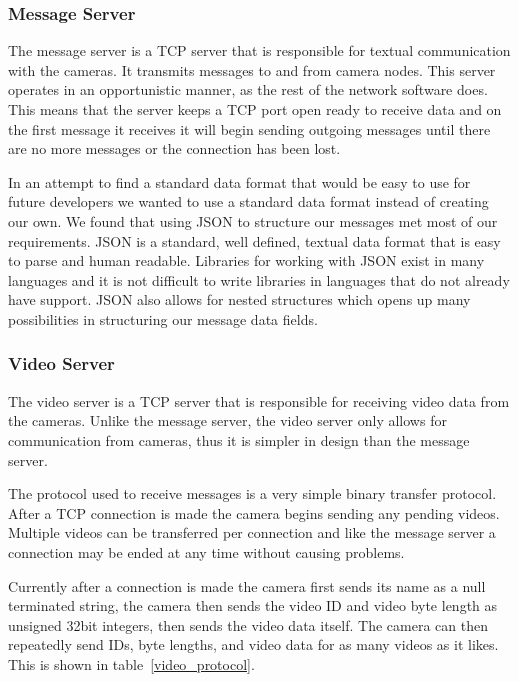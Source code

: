 \subsubsection{Message Server}

The message server is a TCP server that is responsible for textual communication
with the cameras. It transmits messages to and from camera nodes. This server
operates in an opportunistic manner, as the rest of the network software does.
This means that the server keeps a TCP port open ready to receive data and on
the first message it receives it will begin sending outgoing messages until
there are no more messages or the connection has been lost.

In an attempt to find a standard data format that would be easy to use for
future developers we wanted to use a standard data format instead of creating
our own. We found that using JSON to structure our messages met most of our
requirements. JSON is a standard, well defined, textual data format that is easy
to parse and human readable. Libraries for working with JSON exist in many
languages and it is not difficult to write libraries in languages that do not
already have support. JSON also allows for nested structures which opens up many
possibilities in structuring our message data fields.


\subsubsection{Video Server}

The video server is a TCP server that is responsible for receiving video data
from the cameras. Unlike the message server, the video server only allows for
communication from cameras, thus it is simpler in design than the message
server.

The protocol used to receive messages is a very simple binary transfer protocol.
After a TCP connection is made the camera begins sending any pending videos.
Multiple videos can be transferred per connection and like the
message server a connection may be ended at any time without causing problems.

Currently after a connection is made the camera first sends its name as a null
terminated string, the camera then sends the video ID and video byte length as
unsigned 32bit integers, then sends the video data itself.  The camera can then
repeatedly send IDs, byte lengths, and video data for as many videos as it
likes. This is shown in table~\ref{video_protocol}.

